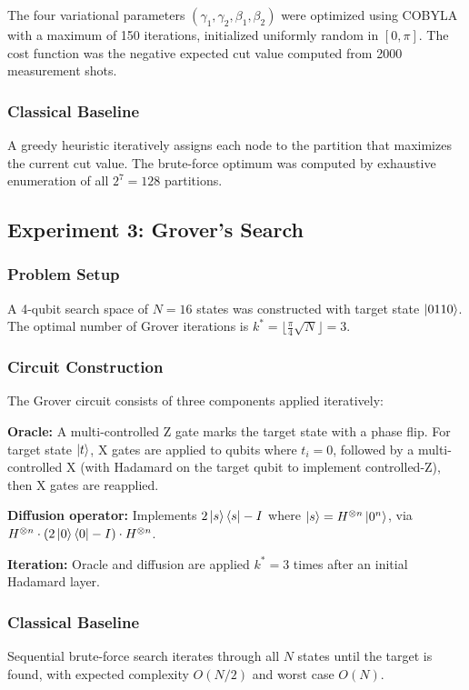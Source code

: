 \documentclass[conference]{IEEEtran}
\begin{document}
The four variational parameters $(\gamma_1, \gamma_2, \beta_1, \beta_2)$ were optimized using COBYLA with a maximum of 150 iterations, initialized uniformly random in $[0, \pi]$. The cost function was the negative expected cut value computed from 2000 measurement shots.

\subsubsection{Classical Baseline}
A greedy heuristic iteratively assigns each node to the partition that maximizes the current cut value. The brute-force optimum was computed by exhaustive enumeration of all $2^7 = 128$ partitions.

\subsection{Experiment 3: Grover's Search}

\subsubsection{Problem Setup}
A 4-qubit search space of $N = 16$ states was constructed with target state $\ket{0110}$. The optimal number of Grover iterations is $k^* = \lfloor \frac{\pi}{4}\sqrt{N} \rfloor = 3$.

\subsubsection{Circuit Construction}
The Grover circuit consists of three components applied iteratively:

\textbf{Oracle:} A multi-controlled Z gate marks the target state with a phase flip. For target state $\ket{t}$, X gates are applied to qubits where $t_i = 0$, followed by a multi-controlled X (with Hadamard on the target qubit to implement controlled-Z), then X gates are reapplied.

\textbf{Diffusion operator:} Implements $2\ket{s}\bra{s} - I$ where $\ket{s} = H^{\otimes n}\ket{0^n}$, via $H^{\otimes n} \cdot (2\ket{0}\bra{0} - I) \cdot H^{\otimes n}$.

\textbf{Iteration:} Oracle and diffusion are applied $k^* = 3$ times after an initial Hadamard layer.

\subsubsection{Classical Baseline}
Sequential brute-force search iterates through all $N$ states until the target is found, with expected complexity $O(N/2)$ and worst case $O(N)$.
\end{document}

